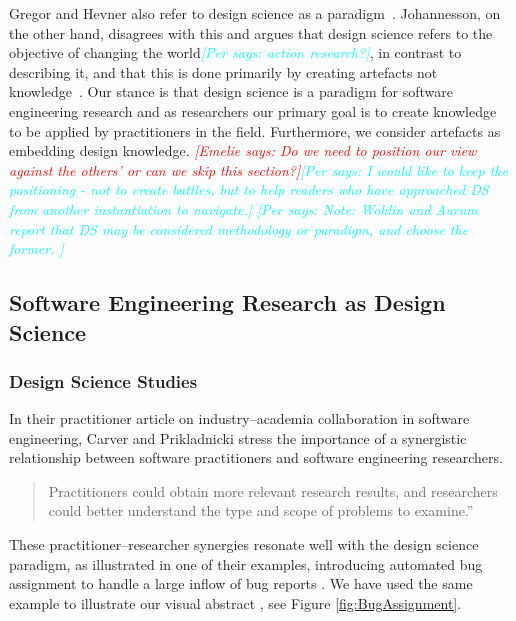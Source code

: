 \documentclass[graybox]{svmult}
\newcommand{\emelie}[1]{\textcolor{red}{{\it [Emelie says: #1]}}}
\newcommand{\per}[1]{\textcolor{cyan}{{\it [Per says: #1]}}}
\newcommand{\emelie}[1]{}
\newcommand{\per}[1]{}
\begin{document}
Gregor and Hevner also refer to design science as a paradigm~\cite{gregor_positioning_2013}. Johannesson, on the other hand, disagrees with this and argues that design science refers to the objective of changing the world\per{action research?}, in contrast to describing it, and that this is done primarily by creating artefacts not knowledge~\cite{johannesson_introduction_2014}. Our stance is that design science is a paradigm for software engineering research and as researchers our primary goal is to create knowledge to be applied by practitioners in the field. Furthermore, we consider artefacts as embedding design knowledge. 
\emelie{Do we need to position our view against the others' or can we skip this section?}\per{I would like to keep the positioning - not to create battles, but to help readers who have approached DS from another  instantiation to navigate.}
\per{Note: Wohlin and Aurum report that DS may be considered methodology or paradigm, and choose the former.\cite{Wohlin2015} }








\subsection{Software Engineering Research as Design Science}

\subsubsection{Design Science Studies}
In their practitioner article on industry--academia collaboration in software engineering, Carver and Prikladnicki stress the importance of a synergistic relationship between software practitioners and software engineering researchers.
\begin{quote}Practitioners could obtain more relevant research results, and researchers could better understand the type and scope of problems to examine.'' \cite{CarverIEEESW2018}
\end{quote} 
These practitioner--researcher synergies resonate well with the design science paradigm, as illustrated in one of their examples, introducing automated bug assignment to handle a large inflow of bug reports \cite{JonssonBug15}. We have used the same example to illustrate our visual abstract \cite{StoreyESEM17}, see Figure \ref{fig:BugAssignment}.
\end{document}
